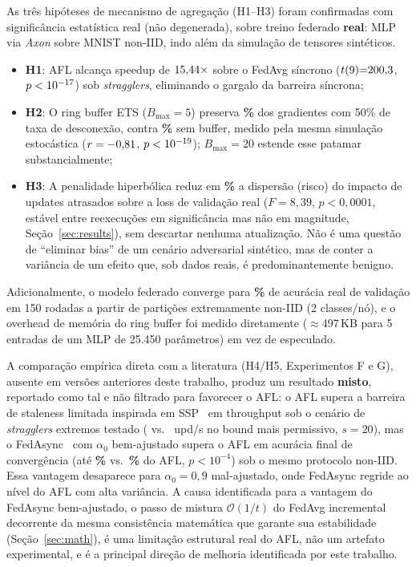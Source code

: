\documentclass[conference,a4paper]{IEEEtran}
\begin{document}
As três hipóteses de mecanismo de agregação (H1--H3) foram confirmadas com
significância estatística real (não degenerada), sobre treino federado
\textbf{real}: MLP via \textit{Axon} sobre MNIST non-IID, indo além da
simulação de tensores sintéticos.
\begin{itemize}[noitemsep,leftmargin=*]
  \item \textbf{H1}: AFL alcança speedup de \textbf{$15{,}44\times$} sobre o FedAvg
    síncrono ($t(9){=}200{,}3$, $p<10^{-17}$) sob \textit{stragglers},
    eliminando o gargalo da barreira síncrona;
  \item \textbf{H2}: O ring buffer ETS ($B_{\max}=5$) preserva
    \textbf{\statExpCPreservationFiftyBFive\%} dos gradientes com 50\% de taxa de desconexão, contra
    \textbf{\statExpCPreservationFiftyBZero\%} sem buffer, medido pela mesma simulação estocástica
    ($r=-0{,}81$, $p<10^{-19}$); $B_{\max}=20$ estende esse patamar
    substancialmente;
  \item \textbf{H3}: A penalidade hiperbólica reduz em \textbf{\statExpBHypReductionGapTwenty\%} a
    dispersão (risco) do impacto de updates atrasados sobre a loss de
    validação real ($F=8{,}39$, $p<0{,}0001$, estável entre reexecuções em
    significância mas não em magnitude, Seção~\ref{sec:results}), sem
    descartar nenhuma
    atualização. Não é uma questão de ``eliminar bias'' de um cenário adversarial
    sintético, mas de conter a variância de um efeito que, sob dados
    reais, é predominantemente benigno.
\end{itemize}
Adicionalmente, o modelo federado converge para \textbf{\statExpDFinalAcc\%} de acurácia
real de validação em 150 rodadas a partir de partições extremamente non-IID
(2 classes/nó), e o overhead de memória do ring buffer foi medido
diretamente ($\approx$497\,KB para 5 entradas de um MLP de 25.450
parâmetros) em vez de especulado.

A comparação empírica direta com a literatura (H4/H5, Experimentos F e G),
ausente em versões anteriores deste trabalho, produz um resultado
\textbf{misto}, reportado como tal e não filtrado para favorecer o
AFL: o AFL supera a barreira de staleness limitada inspirada em
SSP~\cite{ho2013} em throughput sob o cenário de
\textit{stragglers} extremos testado (\textbf{\statExpFAsyncUps} vs.\ \textbf{\statExpFSspUpsTwenty}
upd/s no bound mais permissivo, $s=20$), mas o FedAsync~\cite{xie2019} com
$\alpha_0$ bem-ajustado supera o AFL em acurácia final de convergência
(até \textbf{\statExpGFedAsyncAccAlphaFive\%} vs.\ \textbf{\statExpGAflAcc\%} do AFL, $p<10^{-4}$) sob o
mesmo protocolo non-IID. Essa vantagem desaparece para $\alpha_0=0{,}9$
mal-ajustado, onde FedAsync regride ao nível do AFL com alta variância.
A causa identificada para a vantagem do FedAsync bem-ajustado, o passo de mistura
$\mathcal{O}(1/t)$ do FedAvg incremental decorrente da mesma consistência
matemática que garante sua estabilidade (Seção~\ref{sec:math}), é uma
limitação estrutural real do AFL, não um artefato experimental, e é a
principal direção de melhoria identificada por este trabalho.
\end{document}
